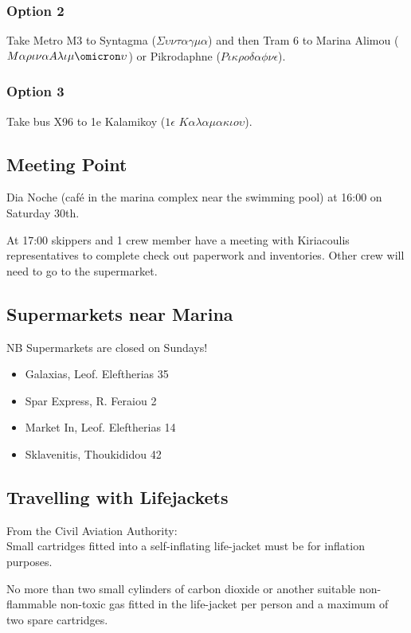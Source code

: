 \documentclass[12pt,a4paper,oneside]{article}
\begin{document}
\begin{multicols}{2}
\subsubsection*{Option 2}
Take Metro M3 to Syntagma ($\Sigma\upsilon\nu\tau\alpha\gamma\mu\alpha$) and then Tram 6 to Marina Alimou ($M\alpha\rho\iota\nu\alpha A\lambda\iota\mu\omicron\upsilon $) or Pikrodaphne ($P\iota\kappa\rho o \delta\alpha\phi\nu\epsilon $).
\subsubsection*{Option 3}
Take bus X96 to 1e Kalamikoy ($1\epsilon$ $K\alpha\lambda\alpha\mu\alpha\kappa\iota o \upsilon$).

\subsection*{Meeting Point}

\noindent Dia Noche (café in the marina complex near the swimming pool) at 16:00 on Saturday 30th.

\noindent At 17:00 skippers and 1 crew member have a meeting with Kiriacoulis representatives to complete check out paperwork and inventories.  Other crew will need to go to the supermarket.

\subsection*{Supermarkets near Marina}
NB Supermarkets are closed on Sundays!
\begin{itemize}
\item Galaxias, Leof. Eleftherias 35
\item Spar Express, R. Feraiou 2
\item Market In, Leof. Eleftherias 14
\item Sklavenitis, Thoukididou 42
\end{itemize}


\subsection*{Travelling with Lifejackets}
From the Civil Aviation Authority:\\

Small cartridges fitted into a self-inflating life-jacket must be for inflation purposes.

No more than two small cylinders of carbon dioxide or another suitable non-flammable non-toxic gas fitted in the life-jacket per person and a maximum of two spare cartridges.


\end{multicols}
\end{document}
